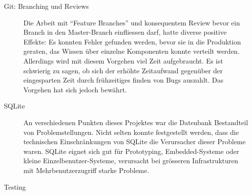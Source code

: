 \begin{description}
	\item[Git: Branching und Reviews] Die Arbeit mit \enquote{Feature Branches} und
	konsequentem Review bevor ein Branch in den Master-Branch einfliessen darf,
	hatte diverse positive Effekte: Es konnten Fehler gefunden werden, bevor sie in
	die Produktion geraten, das Wissen über einzelne Komponenten konnte verteilt
	werden. Allerdings wird mit diesem Vorgehen viel Zeit aufgebraucht. Es ist schwierig
	zu sagen, ob sich der erhöhte Zeitaufwand gegenüber der eingesparten Zeit
	durch frühzeitiges finden von Bugs auszahlt. Das Vorgehen hat sich jedoch
	bewährt.
	
	\item[SQLite] An verschiedenen Punkten dieses Projektes war die Datenbank
	Bestandteil von Problemstellungen. Nicht selten konnte festgestellt werden,
	dass die technischen Einschränkungen von SQLite die Verursacher dieser Probleme
	waren. SQLite eignet sich gut für Prototyping, Embedded-Systeme oder kleine
	Einzelbenutzer-Systeme, verursacht bei grösseren Infrastrukturen mit
	Mehrbenutzerzugriff starke Probleme.
	
	\item[Testing] 
	
\end{description}

